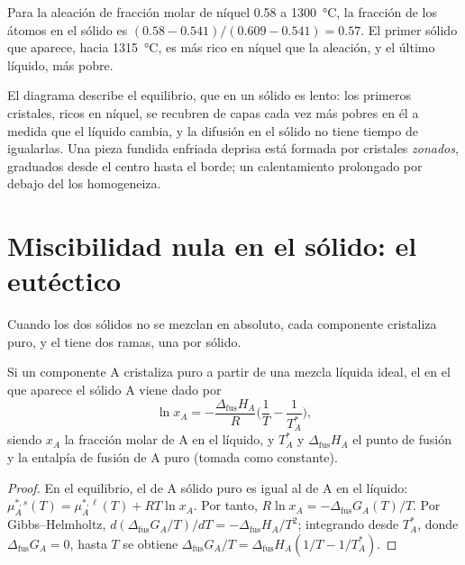 \begin{example}\label{ex:b2:solid-liquid-diagrams:lever}
Para la aleación de fracción molar de níquel 0.58 a \qty{1300}{\degreeCelsius}, la
fracción de los átomos en el sólido es $(0.58 - 0.541)/(0.609 - 0.541) = 0.57$.
El primer sólido que aparece, hacia \qty{1315}{\degreeCelsius}, es más rico en níquel
que la aleación, y el último líquido, más pobre.
\end{example}

El diagrama describe el equilibrio, que en un sólido es lento: los primeros cristales,
ricos en níquel, se recubren de capas cada vez más pobres en él a medida que el líquido
cambia, y la difusión en el sólido no tiene tiempo de igualarlas. Una pieza fundida
enfriada deprisa está formada por cristales \textit{zonados}, graduados desde el centro hasta el
borde; un calentamiento prolongado por debajo del  los homogeneiza.

\section{Miscibilidad nula en el sólido: el eutéctico}

Cuando los dos sólidos no se mezclan en absoluto, cada componente cristaliza puro, y
el  tiene dos ramas, una por sólido.

\begin{theorem}\label{thm:b2:solid-liquid-diagrams:schroder}
Si un componente A cristaliza puro a partir de una mezcla líquida ideal, el 
en el que aparece el sólido A viene dado por
\[
  \ln x_A = -\frac{\Delta_{\text{fus}}H_A}{R}\Big(\frac1T - \frac1{T_A^*}\Big),
\]
siendo $x_A$ la fracción molar de A en el líquido, y $T_A^*$ y
$\Delta_{\text{fus}}H_A$ el punto de fusión y la entalpía de fusión de A puro
(tomada como constante).
\end{theorem}

\begin{proof}
En el equilibrio, el  de A sólido puro es igual al de A en el
líquido: $\mu_A^{*,s}(T) = \mu_A^{*,\ell}(T) + RT\ln x_A$. Por tanto, $R\ln x_A =
-\Delta_{\text{fus}}G_A(T)/T$. Por Gibbs--Helmholtz, $d(\Delta_{\text{fus}}G_A/T)/
dT = -\Delta_{\text{fus}}H_A/T^2$; integrando desde $T_A^*$, donde
$\Delta_{\text{fus}}G_A = 0$, hasta $T$ se obtiene $\Delta_{\text{fus}}G_A/T =
\Delta_{\text{fus}}H_A(1/T - 1/T_A^*)$.
\end{proof}


